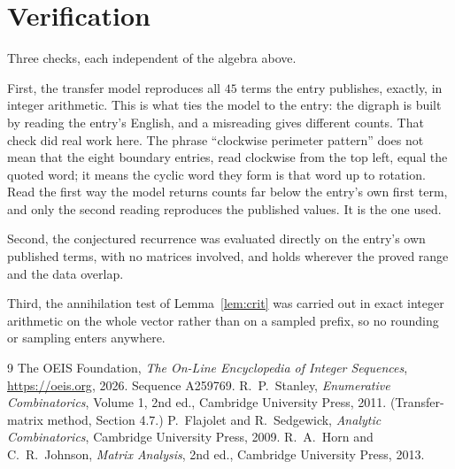 \documentclass[11pt,a4paper]{article}
\theoremstyle{plain}
\theoremstyle{definition}
\begin{document}
\section{Verification}

Three checks, each independent of the algebra above.

First, the transfer model reproduces all $45$ terms the entry publishes, exactly, in
integer arithmetic. This is what ties the model to the entry: the digraph is built by reading
the entry's English, and a misreading gives different counts. That check did real work here. The phrase ``clockwise perimeter pattern'' does not mean that the eight boundary entries, read clockwise from the top left, equal the quoted word; it means the cyclic word they form is that word up to rotation. Read the first way the model returns counts far below the entry's own first term, and only the second reading reproduces the published values. It is the one used.

Second, the conjectured recurrence was evaluated directly on the entry's own published terms,
with no matrices involved, and holds wherever the proved range and the data overlap.

Third, the annihilation test of Lemma~\ref{lem:crit} was carried out in exact integer
arithmetic on the whole vector rather than on a sampled prefix, so no rounding or sampling
enters anywhere.

\begin{thebibliography}{9}
 The OEIS Foundation, \emph{The On-Line Encyclopedia of Integer
Sequences}, \url{https://oeis.org}, 2026. Sequence A259769.
 R.~P.~Stanley, \emph{Enumerative Combinatorics}, Volume 1, 2nd ed.,
Cambridge University Press, 2011. (Transfer-matrix method, Section 4.7.)
 P.~Flajolet and R.~Sedgewick, \emph{Analytic Combinatorics}, Cambridge
University Press, 2009.
 R.~A.~Horn and C.~R.~Johnson, \emph{Matrix Analysis}, 2nd ed., Cambridge
University Press, 2013.
\end{thebibliography}
\end{document}
